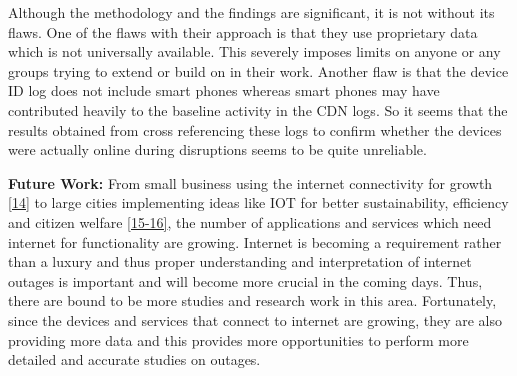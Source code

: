 \documentclass[11pt,twoside,a4paper]{article}
\begin{document}
Although the methodology and the findings are significant, it is not without its flaws. One of the flaws with their approach is that they use proprietary data which is not universally available. This severely imposes limits on anyone or any groups trying to extend or build on in their work. Another flaw is that the device ID log does not include smart phones whereas smart phones may have contributed heavily to the baseline activity in the CDN logs. So it seems that the results obtained from cross referencing these logs to confirm whether the devices were actually online during disruptions seems to be quite unreliable.   

\textbf{Future Work:} From small business using the internet connectivity for growth \hyperlink {K14} {[14]} to large cities implementing ideas like IOT for better sustainability, efficiency and citizen welfare \hyperlink {K15} {[15-16]}, the number of applications and services which need internet for functionality are growing. Internet is becoming a requirement rather than a luxury and thus proper understanding and interpretation of internet outages is important and will become more crucial in the coming days. Thus, there are bound to be more studies and research work in this area. Fortunately, since the devices and services that connect to internet are growing, they are also providing more data and this provides more opportunities to perform more detailed and accurate studies on outages.
\end{document}
